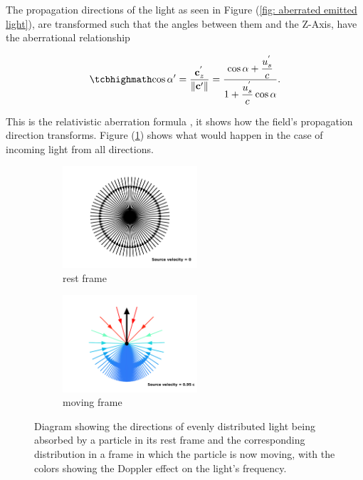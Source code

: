 The propagation directions of the light as seen in Figure (\ref{fig: aberrated emitted light}), are transformed such that the angles between them and the Z-Axis, have the aberrational relationship

\begin{equation}
	\label{eq: Cosine transform}
	\mhl{
		\cos\alpha{'} = \frac{\mathbf{c}_{z}^{'}}{\|\mathbf{c}{'}\|} = \dfrac{\cos\alpha + \dfrac{u_{s}^{'}}{c}}{1 + \dfrac{u_{s}^{'}}{c}\cos\alpha}.
	}
\end{equation}

This is the relativistic aberration formula \cite{einstein1905electrodynamics}, it shows how the field's propagation direction transforms.
Figure (\ref{fig: aberrated absorbed light}) shows what would happen in the case of incoming light from all directions.

\begin{figure}[ht]
	\begin{subfigure}{.49\textwidth}
		\centering
		\includegraphics[width = 5cm]{images/pdf/Aberrated_velocities_inwards_restframe.pdf}
		\caption{rest frame}
	\end{subfigure}
	\begin{subfigure}{.49\textwidth}
		\centering
		\includegraphics[width = 5cm]{images/pdf/Aberrated_velocities_inwards.pdf}
		\caption{moving frame}
	\end{subfigure}
	\caption{Diagram showing the directions of evenly distributed light being absorbed by a particle in its rest frame and the corresponding distribution in a frame in which the particle is now moving, with the colors showing the Doppler effect on the light's frequency.}
	\label{fig: aberrated absorbed light}
\end{figure}

